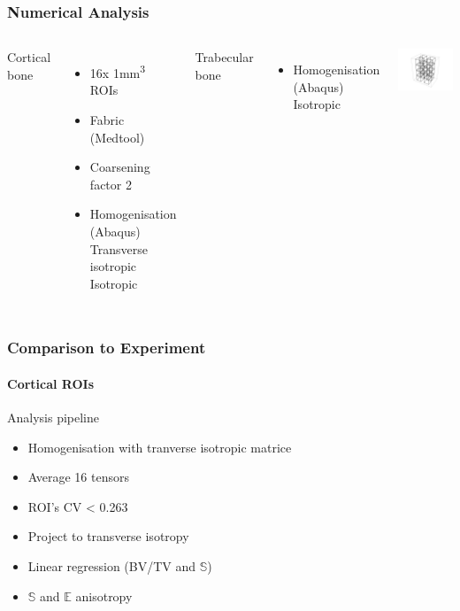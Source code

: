 \documentclass[xcolor=table,11pt]{beamer}
\begin{document}
	\begin{frame}
		\frametitle{Numerical Analysis}
		\begin{columns}
			Cortical bone
			\begin{itemize}
				\item 16x 1mm\textsuperscript{3} ROIs
				\item Fabric (Medtool)
				\item Coarsening factor 2
				\item Homogenisation (Abaqus)\\
					  Transverse isotropic\\
					  Isotropic
			\end{itemize}
			\vfill
			Trabecular bone
			\begin{itemize}
				\item Homogenisation (Abaqus)\\
					  Isotropic
			\end{itemize}

			\includegraphics[width=\linewidth]{../Results/ROIs/ROIs}
		\end{columns}
	\end{frame}

	\begin{frame}
		\frametitle{Comparison to Experiment}
		\framesubtitle{Cortical ROIs}
		Analysis pipeline
		\begin{itemize}
			\item Homogenisation with tranverse isotropic matrice
			\item Average 16 tensors
			\item ROI's CV < 0.263
			\item Project to transverse isotropy
			\item Linear regression (BV/TV and $\mathbb{S}$)
			\item $\mathbb{S}$ and $\mathbb{E}$ anisotropy
		\end{itemize}
	\end{frame}
\end{document}
